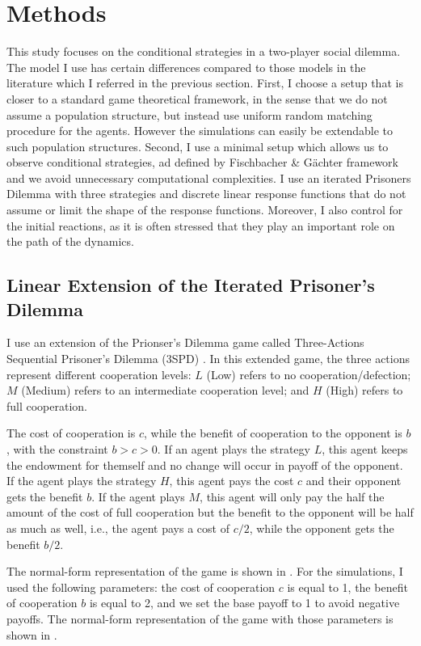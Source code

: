\documentclass[12pt]{article}
\begin{document}
\section*{Methods}

This study focuses on the conditional strategies in a two-player social dilemma. The model I use has certain differences compared to those models in the literature which I referred in the previous section. First, I choose a setup that is closer to a standard game theoretical framework, in the sense that we do not assume a population structure, but instead use uniform random matching procedure for the agents. However the simulations can easily be extendable to such population structures. Second, I use a minimal setup which allows us to observe conditional strategies, ad defined by Fischbacher \& G{\"a}chter framework and we avoid unnecessary computational complexities. I use an iterated Prisoners Dilemma with three strategies and discrete linear response functions that do not assume or limit the shape of the response functions. Moreover, I also control for the initial reactions, as it is often stressed that they play an important role on the path of the dynamics. 

\subsection*{Linear Extension of the Iterated Prisoner's Dilemma} 
 I use an extension of the Prionser's Dilemma game called Three-Actions Sequential Prisoner’s Dilemma (3SPD) \citep{andreozzi2020stability}. In this extended game, the three actions represent different cooperation levels: $L$ (Low) refers to no cooperation/defection; $M$ (Medium) refers to an intermediate cooperation level; and $H$ (High) refers to full cooperation.  

The cost of cooperation is $c$, while the benefit of cooperation to the opponent is $b$, with the constraint $b>c>0$. If an agent plays the strategy $L$, this agent keeps the endowment for themself and no change will occur in payoff of the opponent. If the agent plays the strategy $H$, this agent pays the cost $c$ and their opponent gets the benefit $b$. If the agent plays $M$, this agent will only pay the half the amount of the cost of full cooperation but the benefit to the opponent will be half as much as well, i.e., the agent pays a cost of $c/2$, while the opponent gets the benefit $b/2$. 

The normal-form representation of the game is shown in . For the simulations, I used the following parameters: the cost of cooperation $c$ is equal to 1, the benefit of cooperation $b$ is equal to 2, and we set the base payoff to 1 to avoid negative payoffs. The normal-form representation of the game with those parameters is shown in .
\end{document}
